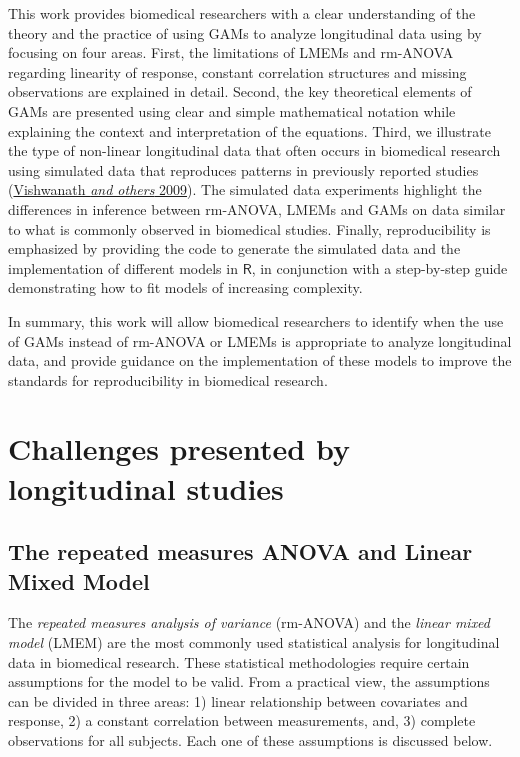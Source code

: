 \documentclass[
]{article}
\begin{document}
This work provides biomedical researchers with a clear understanding of the theory and the practice of using GAMs to analyze longitudinal data using by focusing on four areas. First, the limitations of LMEMs and rm-ANOVA regarding linearity of response, constant correlation structures and missing observations are explained in detail. Second, the key theoretical elements of GAMs are presented using clear and simple mathematical notation while explaining the context and interpretation of the equations. Third, we illustrate the type of non-linear longitudinal data that often occurs in biomedical research using simulated data that reproduces patterns in previously reported studies (\protect\hyperlink{ref-vishwanath2009}{Vishwanath \emph{and others} 2009}). The simulated data experiments highlight the differences in inference between rm-ANOVA, LMEMs and GAMs on data similar to what is commonly observed in biomedical studies. Finally, reproducibility is emphasized by providing the code to generate the simulated data and the implementation of different models in \(\textsf{R}\), in conjunction with a step-by-step guide demonstrating how to fit models of increasing complexity.

In summary, this work will allow biomedical researchers to identify when the use of GAMs instead of rm-ANOVA or LMEMs is appropriate to analyze longitudinal data, and provide guidance on the implementation of these models to improve the standards for reproducibility in biomedical research.

\hypertarget{challenges-presented-by-longitudinal-studies}{%
\section{Challenges presented by longitudinal studies}\label{challenges-presented-by-longitudinal-studies}}

\hypertarget{the-repeated-measures-anova-and-linear-mixed-model}{%
\subsection{The repeated measures ANOVA and Linear Mixed Model}\label{the-repeated-measures-anova-and-linear-mixed-model}}

The \emph{repeated measures analysis of variance} (rm-ANOVA) and the \emph{linear mixed model} (LMEM) are the most commonly used statistical analysis for longitudinal data in biomedical research. These statistical methodologies require certain assumptions for the model to be valid. From a practical view, the assumptions can be divided in three areas: 1) linear relationship between covariates and response, 2) a constant correlation between measurements, and, 3) complete observations for all subjects. Each one of these assumptions is discussed below.
\end{document}
